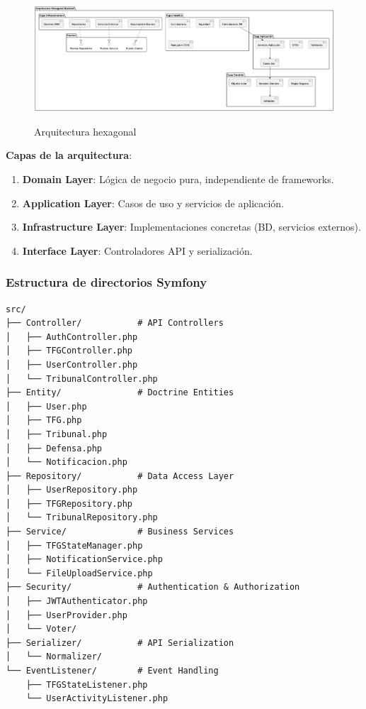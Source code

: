 \documentclass[12pt,a4paper,oneside]{report}
\providecommand{\tightlist}{%
  \setlength{\itemsep}{0pt}\setlength{\parskip}{0pt}}
\providecommand{\pandocbounded}[1]{#1}
\begin{document}
\begin{figure}[H]
\centering
\pandocbounded{\includegraphics[keepaspectratio,alt={Arquitectura hexagonal}]{processed/images/05_diseno_plantuml_1.png}}
\caption{Arquitectura hexagonal}
\label{fig:arquitectura-hexagonal}
\end{figure}

\textbf{Capas de la arquitectura}:

\begin{enumerate}
\def\labelenumi{\arabic{enumi}.}
\tightlist
\item
  \textbf{Domain Layer}: Lógica de negocio pura, independiente de
  frameworks.
\item
  \textbf{Application Layer}: Casos de uso y servicios de aplicación.
\item
  \textbf{Infrastructure Layer}: Implementaciones concretas (BD,
  servicios externos).
\item
  \textbf{Interface Layer}: Controladores API y serialización.
\end{enumerate}

\subsubsection{Estructura de directorios
Symfony}\label{estructura-de-directorios-symfony}

\begin{lstlisting}
src/
├── Controller/           # API Controllers
│   ├── AuthController.php
│   ├── TFGController.php
│   ├── UserController.php
│   └── TribunalController.php
├── Entity/               # Doctrine Entities
│   ├── User.php
│   ├── TFG.php
│   ├── Tribunal.php
│   ├── Defensa.php
│   └── Notificacion.php
├── Repository/           # Data Access Layer
│   ├── UserRepository.php
│   ├── TFGRepository.php
│   └── TribunalRepository.php
├── Service/              # Business Services
│   ├── TFGStateManager.php
│   ├── NotificationService.php
│   └── FileUploadService.php
├── Security/             # Authentication & Authorization
│   ├── JWTAuthenticator.php
│   ├── UserProvider.php
│   └── Voter/
├── Serializer/           # API Serialization
│   └── Normalizer/
└── EventListener/        # Event Handling
    ├── TFGStateListener.php
    └── UserActivityListener.php
\end{lstlisting}
\end{document}
